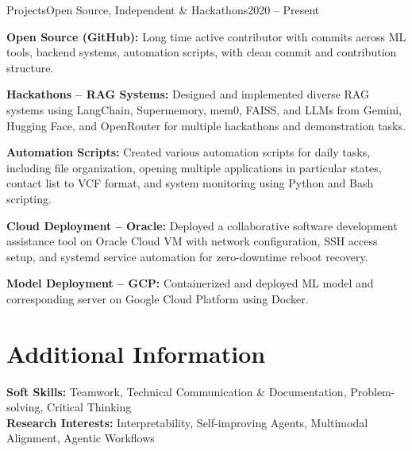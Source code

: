 \documentclass[10pt, letterpaper]{article}
\newcommand{\skill}[2]{\textbf{#1:} #2}
\begin{document}
\begin{experienceentry}{Projects}{Open Source, Independent \& Hackathons}{2020 -- Present}
    \item \textbf{Open Source (GitHub):} Long time active contributor with commits across ML tools, backend systems, automation scripts, with clean commit and contribution structure.
    \item \textbf{Hackathons – RAG Systems:} Designed and implemented diverse RAG systems using LangChain, Supermemory, mem0, FAISS, and LLMs from Gemini, Hugging Face, and OpenRouter for multiple hackathons and demonstration tasks.
    \item \textbf{Automation Scripts:} Created various automation scripts for daily tasks, including file organization, opening multiple applications in particular states, contact list to VCF format, and system monitoring using Python and Bash scripting.
    \item \textbf{Cloud Deployment – Oracle:} Deployed a collaborative software development assistance tool on Oracle Cloud VM with network configuration, SSH access setup, and systemd service automation for zero-downtime reboot recovery.
    \item \textbf{Model Deployment – GCP:} Containerized and deployed ML model and corresponding server on Google Cloud Platform using Docker.
\end{experienceentry}


\section{Additional Information}
\skill{Soft Skills}{Teamwork, Technical Communication \& Documentation, Problem-solving, Critical Thinking}\\
\skill{Research Interests}{Interpretability, Self-improving Agents, Multimodal Alignment, Agentic Workflows}


\noindent{}
\end{document}
